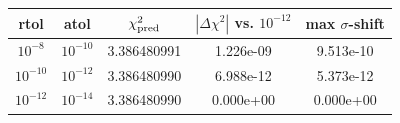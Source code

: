 \begin{tabular}{ccccc}
\toprule
rtol & atol & $\chi^2_{\rm pred}$ & $|\Delta\chi^2|$ vs. $10^{-12}$ & max $\sigma$-shift \\
\midrule
$10^{-8}$ & $10^{-10}$ & 3.386480991 & 1.226e-09 & 9.513e-10 \\
$10^{-10}$ & $10^{-12}$ & 3.386480990 & 6.988e-12 & 5.373e-12 \\
$10^{-12}$ & $10^{-14}$ & 3.386480990 & 0.000e+00 & 0.000e+00 \\
\bottomrule
\end{tabular}
